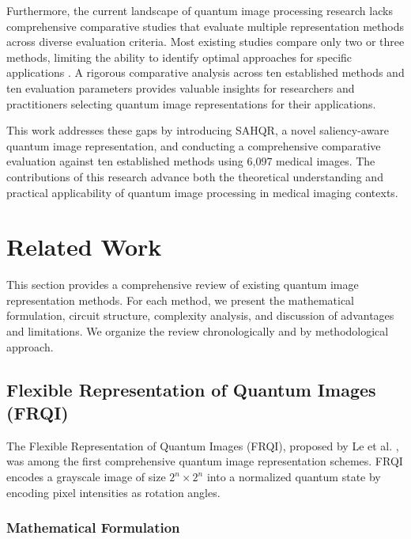 \documentclass{ipol}
\begin{document}
Furthermore, the current landscape of quantum image processing research lacks comprehensive comparative studies that evaluate multiple representation methods across diverse evaluation criteria. Most existing studies compare only two or three methods, limiting the ability to identify optimal approaches for specific applications \cite{bib42}. A rigorous comparative analysis across ten established methods and ten evaluation parameters provides valuable insights for researchers and practitioners selecting quantum image representations for their applications.

This work addresses these gaps by introducing SAHQR, a novel saliency-aware quantum image representation, and conducting a comprehensive comparative evaluation against ten established methods using 6,097 medical images. The contributions of this research advance both the theoretical understanding and practical applicability of quantum image processing in medical imaging contexts.




\section{Related Work}\label{sec:related}

This section provides a comprehensive review of existing quantum image representation methods. For each method, we present the mathematical formulation, circuit structure, complexity analysis, and discussion of advantages and limitations. We organize the review chronologically and by methodological approach.

\subsection{Flexible Representation of Quantum Images (FRQI)}

The Flexible Representation of Quantum Images (FRQI), proposed by Le et al. \cite{bib18}, was among the first comprehensive quantum image representation schemes. FRQI encodes a grayscale image of size $2^n \times 2^n$ into a normalized quantum state by encoding pixel intensities as rotation angles.

\subsubsection{Mathematical Formulation}
\end{document}
